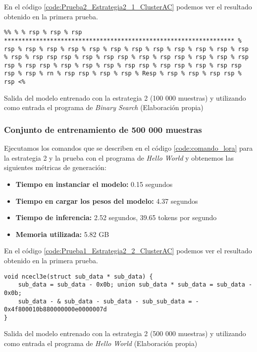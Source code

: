 En el código \ref{code:Prueba2_Estrategia2_1_ClusterAC} podemos ver el resultado obtenido
en la primera prueba.

\begin{mycode}
    \begin{verbatim}
%% % % rsp % rsp % rsp ***************************************************************** % rsp % rsp % rsp % rsp % rsp % rsp % rsp % rsp % rsp % rsp % rsp % rsp % rsp % rsp rsp rsp % rsp % rsp rsp % rsp % rsp rsp % rsp % rsp % rsp rsp % rsp rsp % rsp % rsp % rsp % rsp rsp % rsp rsp % rsp % rsp rsp rsp % rsp % rn % rsp rsp % rsp % rsp % Resp % rsp % rsp % rsp rsp % rsp <%
    \end{verbatim}
    \caption[Salida del modelo entrenado con la estrategia 2 (100 000 muestras) y utilizando como entrada el programa de \textit{Binary Search}]{Salida del modelo entrenado con la estrategia 2 (100 000 muestras) y utilizando como entrada el programa de \textit{Binary Search} (Elaboración propia)}
    \label{code:Prueba2_Estrategia2_1_ClusterAC}
\end{mycode}

\subsubsection{Conjunto de entrenamiento de 500 000 muestras}

Ejecutamos los comandos que se describen en el código \ref{code:comando_lora} para
la estrategia 2 y la prueba con el programa de \textit{Hello World} y obtenemos
las siguientes métricas de generación:

\begin{itemize}
    \item \textbf{Tiempo en instanciar el modelo:} 0.15 segundos
    \item \textbf{Tiempo en cargar los pesos del modelo:} 4.37 segundos
    \item \textbf{Tiempo de inferencia:} 2.52 segundos, 39.65 tokens por segundo
    \item \textbf{Memoria utilizada:} 5.82 GB
\end{itemize}

En el código \ref{code:Prueba1_Estrategia2_2_ClusterAC} podemos ver el resultado obtenido
en la primera prueba.

\begin{mycode}
    \begin{verbatim}
void ncecl3e(struct sub_data * sub_data) {
    sub_data = sub_data - 0x0b; union sub_data * sub_data = sub_data - 0x0b;
    sub_data - & sub_data - sub_data - sub_sub_data = - 0x4f800010b880000000e0000007d
}
    \end{verbatim}
    \caption[Salida del modelo entrenado con la estrategia 2 (500 000 muestras) y utilizando como entrada el programa de \textit{Hello World}]{Salida del modelo entrenado con la estrategia 2 (500 000 muestras) y utilizando como entrada el programa de \textit{Hello World} (Elaboración propia)}
    \label{code:Prueba1_Estrategia2_2_ClusterAC}
\end{mycode}

